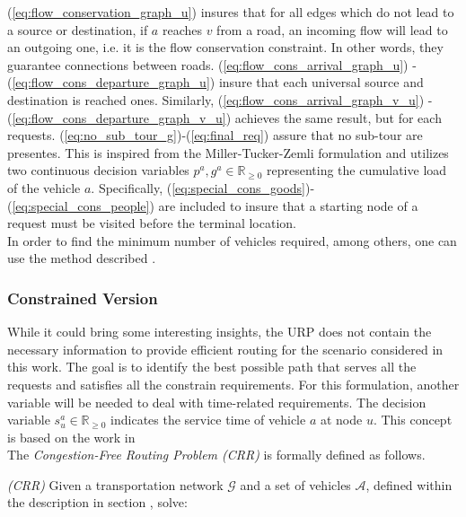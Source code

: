 (\ref{eq:flow_conservation_graph_u}) insures that for all edges which do not lead to a source or destination, if $a$ reaches $v$ from a road, an incoming flow will lead to an outgoing one, i.e. it is the flow conservation constraint. In other words, they guarantee connections between roads. (\ref{eq:flow_cons_arrival_graph_u}) -  (\ref{eq:flow_cons_departure_graph_u}) insure that each universal source and destination is reached ones. Similarly, (\ref{eq:flow_cons_arrival_graph_v_u}) -  (\ref{eq:flow_cons_departure_graph_v_u}) achieves the same result, but for each requests.  (\ref{eq:no_sub_tour_g})-(\ref{eq:final_req}) assure that no sub-tour are presentes. This is inspired from the Miller-Tucker-Zemli formulation and utilizes two continuous decision variables $p^a, g^a \in \mathbb{R}_{\ge0}$ representing the cumulative load of the vehicle $a$. Specifically, (\ref{eq:special_cons_goods})-(\ref{eq:special_cons_people}) are included to insure that a starting node of a request must be visited before the terminal location. \\
In order to find the minimum number of vehicles required, among others, one can use the method described . 
\subsubsection*{Constrained Version}
While it could bring some interesting insights, the URP does not contain the necessary information to provide efficient routing for the scenario considered in this work. The goal is to identify the best possible path that serves all the requests and satisfies all the constrain requirements. For this formulation, another variable will be needed to deal with time-related requirements. The decision variable $s_{u}^a \in \mathbb{R}_{\ge0}$ indicates the service time of vehicle $a$ at node $u$. This concept is based on the work in \cite{inbook_twvrp}\\
The \textit{Congestion-Free Routing Problem (CRR)} is formally defined as follows.\\ 
\begin{algori}{\textit{(CRR)}}
	Given a transportation network $\mathcal{G}$ and a set of vehicles $\mathcal{A}$, defined within the description in section , solve:
\end{algori}


